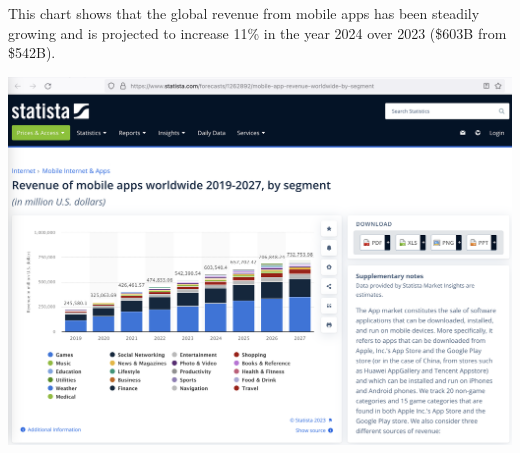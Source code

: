 
This chart shows that the global revenue from mobile apps
has been steadily growing and is projected to increase 11\% in the year 2024 over 2023 (\$603B from \$542B).

\includegraphics[width=\textwidth]{apps-revenue}

\pagebreak
